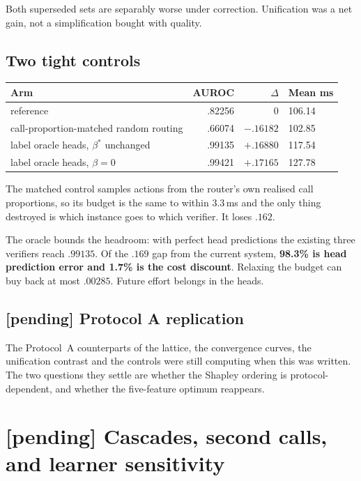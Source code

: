 \documentclass[10pt,a4paper]{article}
\begin{document}
Both superseded sets are separably worse under correction. Unification was a net gain, not a
simplification bought with quality.

\subsection{Two tight controls}

\begin{center}\small
\begin{tabular}{lrrl}
\toprule
Arm & AUROC & $\Delta$ & Mean ms \\
\midrule
reference & .82256 & 0 & 106.14 \\
call-proportion-matched random routing & .66074 & $-.16182$ & 102.85 \\
label oracle heads, $\beta^{*}$ unchanged & .99135 & $+.16880$ & 117.54 \\
label oracle heads, $\beta=0$ & .99421 & $+.17165$ & 127.78 \\
\bottomrule
\end{tabular}
\end{center}

The matched control samples actions from the router's own realised call proportions, so its budget
is the same to within $3.3$\,ms and the only thing destroyed is which instance goes to which
verifier. It loses $.162$.

The oracle bounds the headroom: with perfect head predictions the existing three verifiers reach
$.99135$. Of the $.169$ gap from the current system, \textbf{98.3\% is head prediction error and
1.7\% is the cost discount}. Relaxing the budget can buy back at most $.00285$. Future effort
belongs in the heads.

\subsection{[pending] Protocol A replication}

The Protocol~A counterparts of the lattice, the convergence curves, the unification contrast and
the controls were still computing when this was written. The two questions they settle are whether
the Shapley ordering is protocol-dependent, and whether the five-feature optimum reappears.

\section{[pending] Cascades, second calls, and learner sensitivity}
\end{document}
